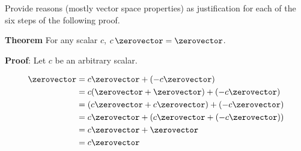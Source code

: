 Provide reasons (mostly vector space properties) as justification for each of the six steps of the following proof.\par
%
{\bf Theorem} 
For any scalar $c$,  $c\,\zerovector = \zerovector$.\par
%
{\bf Proof}: Let $c$ be an arbitrary scalar.\par
%
\begin{align*}
\zerovector
&= c\zerovector + (-c\zerovector)\\
&= c(\zerovector + \zerovector) + (-c\zerovector)\\
&= (c\zerovector + c\zerovector) + (-c\zerovector)\\
&= c\zerovector + (c\zerovector + (-c\zerovector))\\
&= c\zerovector + \zerovector\\
&= c\zerovector
\end{align*}
